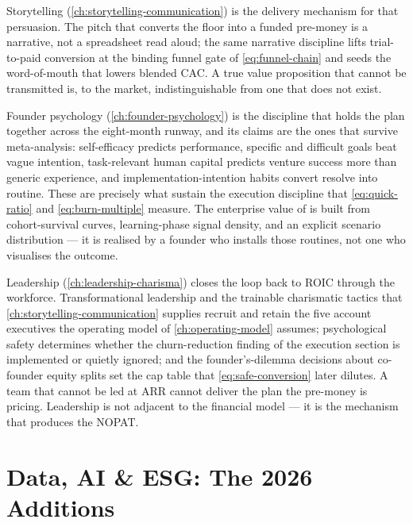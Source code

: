 Storytelling (\cref{ch:storytelling-communication}) is the delivery mechanism for that
persuasion. The pitch that converts the  floor into a funded 
pre-money is a narrative, not a spreadsheet read aloud; the same narrative discipline lifts
trial-to-paid conversion at the binding funnel gate of \cref{eq:funnel-chain} and seeds the
word-of-mouth that lowers blended CAC. A true value proposition that cannot be transmitted is,
to the market, indistinguishable from one that does not exist.

Founder psychology (\cref{ch:founder-psychology}) is the discipline that holds the plan together
across the eight-month runway, and its claims are the ones that survive meta-analysis:
self-efficacy predicts performance, specific and difficult goals beat vague intention,
task-relevant human capital predicts venture success more than generic experience, and
implementation-intention habits convert resolve into routine. These are precisely what sustain
the execution discipline that \cref{eq:quick-ratio} and \cref{eq:burn-multiple} measure. The
enterprise value of  is built from cohort-survival curves, learning-phase signal
density, and an explicit scenario distribution --- it is realised by a founder who installs those
routines, not one who visualises the outcome.

Leadership (\cref{ch:leadership-charisma}) closes the loop back to ROIC through the workforce.
Transformational leadership and the trainable charismatic tactics that
\cref{ch:storytelling-communication} supplies recruit and retain the five account executives the
operating model of \cref{ch:operating-model} assumes; psychological safety determines whether
the churn-reduction finding of the execution section is implemented or quietly ignored; and the
founder's-dilemma decisions about co-founder equity splits set the cap table that
\cref{eq:safe-conversion} later dilutes. A team that cannot be led at  ARR cannot
deliver the plan the  pre-money is pricing. Leadership is not adjacent to the
financial model --- it is the mechanism that produces the NOPAT.

\section{Data, AI \& ESG: The 2026 Additions}\label{sec:capstone-new}

